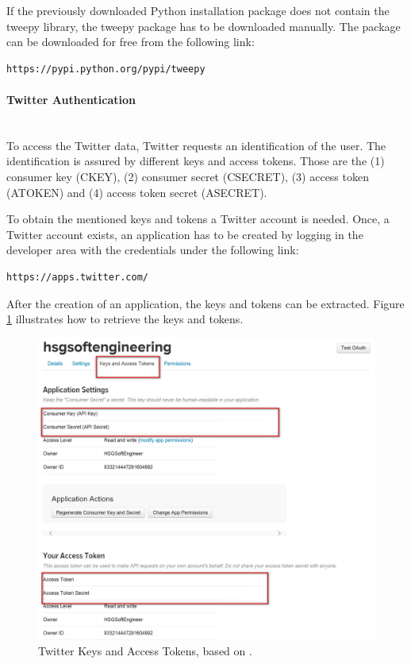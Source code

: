 \documentclass[a4paper,12pt]{article}
\begin{document}
\begin{spacing}{1.2}
If the previously downloaded Python installation package does not contain the tweepy library, the tweepy package has to be downloaded manually. The package can be downloaded for free from the following link:
\begin{lstlisting}[language=bash]
https://pypi.python.org/pypi/tweepy
\end{lstlisting}

\paragraph{Twitter Authentication}\mbox{}\\{}
To access the Twitter data, Twitter requests an identification of the user. The identification is assured by different keys and access tokens. Those are the (1) consumer key (CKEY), (2) consumer secret (CSECRET), (3) access token (ATOKEN) and (4) access token secret (ASECRET). \parencite{twitterinc2017b}

To obtain the mentioned keys and tokens a Twitter account is needed. Once, a Twitter account exists, an application has to be created by logging in the developer area with the credentials under the following link: 
\begin{lstlisting}[language=bash]
https://apps.twitter.com/
\end{lstlisting}

After the creation of an application, the keys and tokens can be extracted. Figure \ref{figkeysandtokens} illustrates how to retrieve the keys and tokens.\\
\begin{figure}[H]
\centering
\includegraphics[scale=0.6]{twitteraccess}
\caption{Twitter Keys and Access Tokens, based on \textcite{twitterinc2017c}.}
\label{figkeysandtokens}
\end{figure}


\end{spacing}
\end{document}
